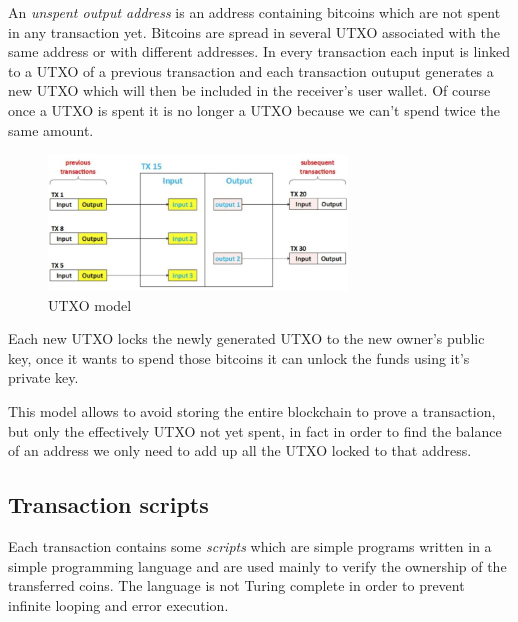 An \emph{unspent output address} is an address containing bitcoins which are not spent in any transaction yet.
Bitcoins are spread in several UTXO associated with the same address or with different addresses.
In every transaction each input is linked to a UTXO of a previous transaction and each transaction outuput generates a new UTXO which will then be included in the receiver's user wallet.
Of course once a UTXO is spent it is no longer a UTXO because we can't spend twice the same amount.

\begin{figure}[H]
    \centering
    \includegraphics[width=300px]{images/6_Bitcoin/02.png}
    \caption{UTXO model}
\end{figure}

Each new UTXO locks the newly generated UTXO to the new owner's public key, once it wants to spend those bitcoins it can unlock the funds using it's private key.

This model allows to avoid storing the entire blockchain to prove a transaction, but only the effectively UTXO not yet spent, in fact in order to find the balance of an address we only need to add up all the UTXO locked to that address.

\subsection{Transaction scripts}
Each transaction contains some \emph{scripts} which are simple programs written in a simple programming language and are used mainly to verify the ownership of the transferred coins.
The language is not Turing complete in order to prevent infinite looping and error execution.


